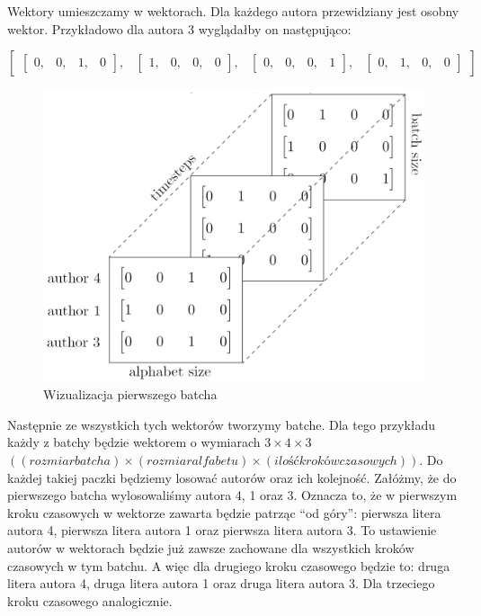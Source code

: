Wektory umieszczamy w wektorach. Dla każdego autora przewidziany jest osobny wektor. 
Przykładowo dla autora 3 wyglądałby on następująco:
\vspace{3mm}

$
\begin{bmatrix} \begin{bmatrix} 0, & 0, & 1, & 0\end{bmatrix},  & \begin{bmatrix} 1, & 0, & 0, & 0\end{bmatrix}, & \begin{bmatrix} 0, & 0, & 0, & 1\end{bmatrix}, & \begin{bmatrix} 0, & 1, & 0, & 0\end{bmatrix} \end{bmatrix}
$



\begin{figure}
\vspace{-4mm}
\includegraphics[width=\linewidth]{./images/batch.png}
\caption{Wizualizacja pierwszego batcha}
\label{fig:test2}
\vspace{-4mm}
\end{figure}
\vspace{4mm}
Następnie ze wszystkich tych wektorów tworzymy batche.
Dla tego przykładu każdy z batchy będzie wektorem o wymiarach $3 \times 4 \times 3$ $((rozmiar batcha) \times 
(rozmiar alfabetu) \times (ilość kroków czasowych))$.
Do każdej takiej paczki będziemy losować autorów oraz ich kolejność. Załóżmy, że do pierwszego batcha
wylosowaliśmy autora 4, 1 oraz 3. Oznacza to, że w pierwszym kroku czasowych w wektorze zawarta będzie 
patrząc ``od góry'': pierwsza litera autora 4, pierwsza litera autora 1 oraz pierwsza litera autora 3.
To ustawienie autorów w wektorach będzie już zawsze zachowane dla wszystkich kroków czasowych w tym batchu. 
A więc dla drugiego kroku czasowego będzie to: druga litera autora 4, druga litera autora 1 oraz druga 
litera autora 3. Dla trzeciego kroku czasowego analogicznie. 

